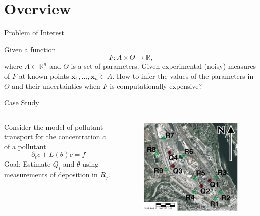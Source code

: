 \documentclass[11pt]{beamer}
\theoremstyle{plain}
\theoremstyle{definition}
\newcommand\ChangeFont{\fontsize{9}{7.2}\selectfont}
\begin{document}
\section{Overview}
\begin{frame}{Problem of Interest}

Given a function
\begin{equation*}
F:A\times\Theta\rightarrow \mathbb{R},
\end{equation*}
where $A\subset\mathbb{R}^{n}$ and $\Theta$ is a set of parameters. Given
experimental (noisy) measures of $F$ at known points $\textbf{x}_{1},\ldots,\textbf{x}_{n}\in A$.
How to infer the values of the parameters in $\Theta$ and their uncertainties when 
$F$ is computationally expensive?

\end{frame}

\begin{frame}{Case Study}

\begin{columns}[c]
\column{1.5in}
Consider the model of pollutant transport for the concentration $c$ of a pollutant
\begin{equation*}
\partial_{t} c+L(\theta)c=f
\end{equation*}
Goal: Estimate $Q_{i}$ and $\theta$ using measurements of deposition in  $R_{j}$.
\column{1.5in}
\begin{figure}
\includegraphics[scale=0.36]{BCtrail}
\ChangeFont
\end{figure}

\end{columns}
\end{frame}
\end{document}
